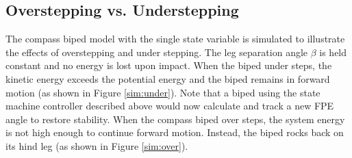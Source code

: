 \subsection{Overstepping vs. Understepping} %
\label{sub:overstepping_understepping_simulation}

The compass biped model with the single state variable is simulated to illustrate the effects of overstepping and under stepping. The leg separation angle $\beta$ is held constant and no energy is lost upon impact. When the biped under steps, the kinetic energy exceeds the potential energy and the biped remains in forward motion (as shown in Figure \ref{sim:under}). Note that a biped using the state machine controller described above would now calculate and track a new FPE angle to restore stability. When the compass biped over steps, the system energy is not high enough to continue forward motion. Instead, the biped rocks back on its hind leg (as shown in Figure \ref{sim:over}).

